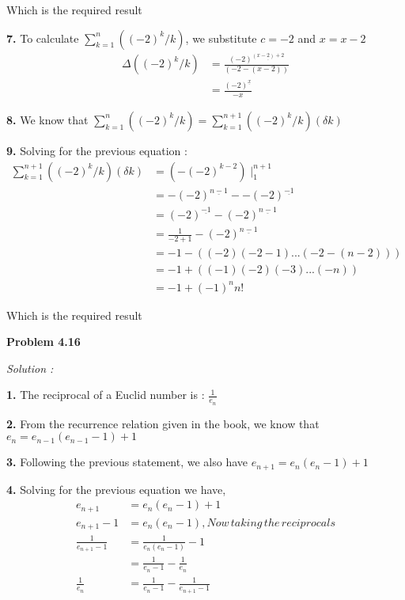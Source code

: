 \documentclass[12pt]{article}
\begin{document}
Which is the required result

{\bf 7. } To calculate $\sum\limits_{k=1}^{n} ((-2)^k/k)$, we substitute $c=-2$ and $x=x-2$
\begin{equation}\label{eq3}
  \begin{split}
     \Delta((-2)^k/k) & =  \frac{(-2)^{\underline{(x-2)+2}}}{(-2 - (x-2))}\\
     & = \frac{(-2)^{\underline{x}}}{-x}
  \end{split}
\end{equation}

{\bf 8. } We know that $ \sum\limits_{k=1}^{n} ((-2)^k/k) = \sum\limits_{k=1}^{n+1} ((-2)^k/k)(\delta k) $

{\bf 9. } Solving for the previous equation :
\begin{equation}\label{eq4}
  \begin{split}
     \sum\limits_{k=1}^{n+1} ((-2)^k/k)(\delta k) & = (-(-2)^{k-2})\mid_{1}^{n+1} \\
     & = {-(-2)^{\underline{n-1}}} - {-(-2)^{\underline{-1}}} \\
     & = {(-2)^{\underline{-1}}} - {(-2)^{\underline{n-1}}}\\
     & = {\frac{1}{-2+1}} - {(-2)^{\underline{n-1}}}\\
     & = -1 - ((-2)(-2-1)...(-2-(n-2)))\\
     & = -1 + ((-1)(-2)(-3)...(-n))\\
     & = -1 + (-1)^nn!
  \end{split}
\end{equation}

Which is the required result

\medskip
\medskip

\noindent
{\bf Problem 4.16}

\textit {Solution :}

{\bf 1. } The reciprocal of a Euclid number is : $\frac{1}{e_n}$

{\bf 2. } From the recurrence relation given in the book, we know that $e_n = e_{n-1} (e_{n-1} -1) + 1$

{\bf 3. } Following the previous statement, we also have $e_{n+1} = e_{n} (e_{n} -1) + 1$

{\bf 4. } Solving for the previous equation we have,
\begin{equation}\label{eq4}
  \begin{split}
     e_{n+1} & = e_{n} (e_{n} -1) + 1 \\
     e_{n+1} - 1 & = e_{n} (e_{n} -1) , Now\,taking\,the\,reciprocals\\
     \frac{1}{e_{n+1} - 1} & = \frac{1}{e_{n} (e_{n} -1)} - 1\\
     & = {\frac{1}{e_{n} -1}} - {\frac{1}{e_{n}}}\\
     {\frac{1}{e_{n}}} & = {\frac{1}{e_{n} -1}} - {\frac{1}{e_{n+1} - 1}}\\
  \end{split}
\end{equation}
\end{document}
